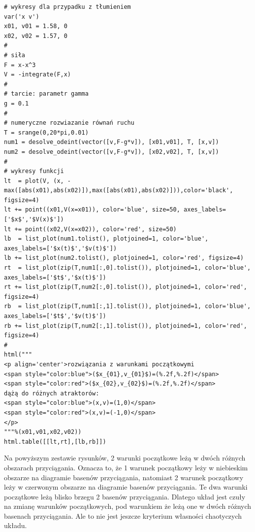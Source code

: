 \documentclass[a4paper,12pt,polish]{sphinxmanual}
\begin{document}
\begin{verbatim}
# wykresy dla przypadku z tłumieniem
var('x v')
x01, v01 = 1.58, 0
x02, v02 = 1.57, 0
#
# siła
F = x-x^3
V = -integrate(F,x)
#
# tarcie: parametr gamma
g = 0.1
#
# numeryczne rozwiazanie równań ruchu
T = srange(0,20*pi,0.01)
num1 = desolve_odeint(vector([v,F-g*v]), [x01,v01], T, [x,v])
num2 = desolve_odeint(vector([v,F-g*v]), [x02,v02], T, [x,v])
#
# wykresy funkcji
lt  = plot(V, (x, -max([abs(x01),abs(x02)]),max([abs(x01),abs(x02)])),color='black',  figsize=4)
lt += point((x01,V(x=x01)), color='blue', size=50, axes_labels=['$x$','$V(x)$'])
lt += point((x02,V(x=x02)), color='red', size=50)
lb  = list_plot(num1.tolist(), plotjoined=1, color='blue', axes_labels=['$x(t)$','$v(t)$'])
lb += list_plot(num2.tolist(), plotjoined=1, color='red', figsize=4)
rt  = list_plot(zip(T,num1[:,0].tolist()), plotjoined=1, color='blue', axes_labels=['$t$','$x(t)$'])
rt += list_plot(zip(T,num2[:,0].tolist()), plotjoined=1, color='red', figsize=4)
rb  = list_plot(zip(T,num1[:,1].tolist()), plotjoined=1, color='blue', axes_labels=['$t$','$v(t)$'])
rb += list_plot(zip(T,num2[:,1].tolist()), plotjoined=1, color='red', figsize=4)
#
html("""
<p align='center'>rozwiązania z warunkami początkowymi
<span style="color:blue">($x_{01},v_{01}$)=(%.2f,%.2f)</span>
<span style="color:red">($x_{02},v_{02}$)=(%.2f,%.2f)</span>
dążą do różnych atraktorów:
<span style="color:blue">(x,v)=(1,0)</span>
<span style="color:red">(x,v)=(-1,0)</span>
</p>
"""%(x01,v01,x02,v02))
html.table([[lt,rt],[lb,rb]])
\end{verbatim}


Na powyższym zestawie rysunków,  2 warunki początkowe leżą w dwóch różnych obszarach  przyciągania.  Oznacza to, że 1 warunek  początkowy leży w  niebieskim obszarze na diagramie basenów przyciągania, natomiast  2 warunek  początkowy leży w  czerwonym obszarze na diagramie basenów przyciągania. Te dwa warunki początkowe leżą blisko brzegu 2 basenów przyciągania. Dlatego układ jest czuły na zmianę warunków początkowych, pod warunkiem że leżą one w dwóch różnych basenach przyciągania. Ale to nie jest jeszcze kryterium własności chaotyczych układu.
\end{document}
